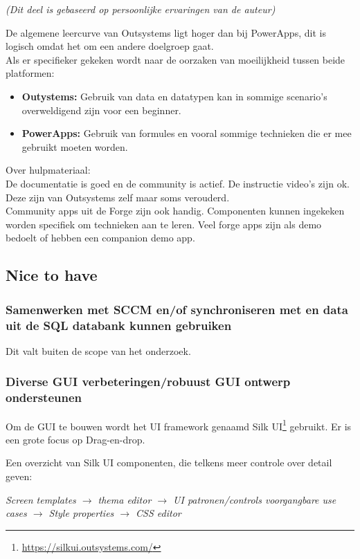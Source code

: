 \textit{(Dit deel is gebaseerd op persoonlijke ervaringen van de auteur)}

De algemene leercurve van Outsystems ligt hoger dan bij PowerApps, dit is logisch omdat het om een andere doelgroep gaat.\\
Als er specifieker gekeken wordt naar de oorzaken van moeilijkheid tussen beide platformen:
\begin{itemize}
    \item \textbf{Outystems:} Gebruik van data en datatypen kan in sommige scenario's overweldigend zijn voor een beginner.
    \item \textbf{PowerApps:} Gebruik van formules en vooral sommige technieken die er mee gebruikt moeten worden.
\end{itemize}

Over hulpmateriaal:\\
De documentatie is goed en de community is actief. De instructie video's zijn ok. Deze zijn van Outsystems zelf maar soms verouderd.\\
Community apps uit de Forge zijn ook handig. Componenten kunnen ingekeken worden specifiek om technieken aan te leren. Veel forge apps zijn als demo bedoelt of hebben een companion demo app.

\subsection{Nice to have}

\subsubsection{Samenwerken met SCCM en/of synchroniseren met en data uit de SQL databank kunnen gebruiken}

Dit valt buiten de scope van het onderzoek.

\subsubsection{Diverse GUI verbeteringen/robuust GUI ontwerp ondersteunen}

Om de GUI te bouwen wordt het UI framework genaamd Silk UI\footnote{\url{https://silkui.outsystems.com/}} gebruikt. Er is een grote focus op Drag-en-drop.

Een overzicht van Silk UI componenten, die telkens meer controle over detail geven:

\textit{Screen templates $\rightarrow$ thema editor $\rightarrow$ UI patronen/controls voorgangbare use cases $\rightarrow$ Style properties $\rightarrow$ CSS editor}

